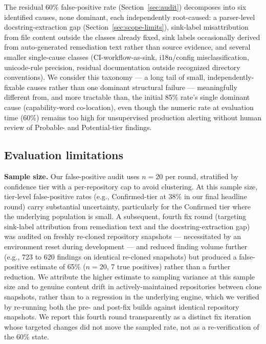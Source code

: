 \documentclass[sigconf,anonymous,review]{acmart}
\begin{document}
The residual 60\% false-positive rate (Section~\ref{sec:audit}) decomposes into six identified causes, none dominant, each independently root-caused: a parser-level docstring-extraction gap (Section~\ref{sec:scope-limits}), sink-label misattribution from file content outside the classes already fixed, sink labels occasionally derived from auto-generated remediation text rather than source evidence, and several smaller single-cause classes (CI-workflow-as-sink, i18n/config misclassification, unicode-rule precision, residual documentation outside recognized directory conventions). We consider this taxonomy --- a long tail of small, independently-fixable causes rather than one dominant structural failure --- meaningfully different from, and more tractable than, the initial 85\% rate's single dominant cause (capability-word co-location), even though the numeric rate at evaluation time (60\%) remains too high for unsupervised production alerting without human review of Probable- and Potential-tier findings.

\subsection{Evaluation limitations}
\label{sec:eval-limits}
\textbf{Sample size.} Our false-positive audit uses $n{=}20$ per round, stratified by confidence tier with a per-repository cap to avoid clustering. At this sample size, tier-level false-positive rates (e.g., Confirmed-tier at 38\% in our final headline round) carry substantial uncertainty, particularly for the Confirmed tier where the underlying population is small. A subsequent, fourth fix round (targeting sink-label attribution from remediation text and the docstring-extraction gap) was audited on freshly re-cloned repository snapshots --- necessitated by an environment reset during development --- and reduced finding volume further (e.g., 723 to 620 findings on identical re-cloned snapshots) but produced a false-positive estimate of 65\% ($n{=}20$, 7 true positives) rather than a further reduction. We attribute the higher estimate to sampling variance at this sample size and to genuine content drift in actively-maintained repositories between clone snapshots, rather than to a regression in the underlying engine, which we verified by re-running both the pre- and post-fix builds against identical repository snapshots. We report this fourth round transparently as a distinct fix iteration whose targeted changes did not move the sampled rate, not as a re-verification of the 60\% state.
\end{document}
